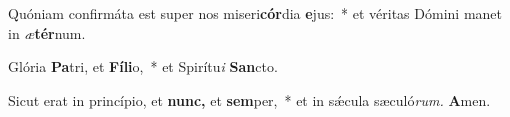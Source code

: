 \item Quóniam confirmáta est super nos miseri\textbf{cór}dia \textbf{e}jus:~* et véritas Dómini manet in \textit{æ}\textbf{tér}num.
\item Glória \textbf{Pa}tri, et \textbf{Fí}\textbf{li}o,~* et Spirítu\textit{i} \textbf{San}cto.
\item Sicut erat in princípio, et \textbf{nunc,} et \textbf{sem}per,~* et in sǽcula sæculó\textit{rum.} \textbf{A}men.